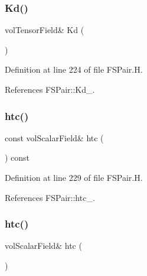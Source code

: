 \subsubsection{\texorpdfstring{Kd()}{Kd()}\hspace{0.1cm}{\footnotesize\ttfamily [2/2]}}
{\footnotesize\ttfamily vol\+Tensor\+Field\& Kd (\begin{DoxyParamCaption}{ }\end{DoxyParamCaption})\hspace{0.3cm}{\ttfamily [inline]}}



Definition at line 224 of file F\+S\+Pair.\+H.



References F\+S\+Pair\+::\+Kd\+\_\+.

\mbox{\label{classFoam_1_1FSPair_af32101ce02f4467ce8810572a2f2359c}} 
\subsubsection{\texorpdfstring{htc()}{htc()}\hspace{0.1cm}{\footnotesize\ttfamily [1/2]}}
{\footnotesize\ttfamily const vol\+Scalar\+Field\& htc (\begin{DoxyParamCaption}{ }\end{DoxyParamCaption}) const\hspace{0.3cm}{\ttfamily [inline]}}



Definition at line 229 of file F\+S\+Pair.\+H.



References F\+S\+Pair\+::htc\+\_\+.

\mbox{\label{classFoam_1_1FSPair_a335e4e1a5b225f46d3d55a033dd721cc}} 
\subsubsection{\texorpdfstring{htc()}{htc()}\hspace{0.1cm}{\footnotesize\ttfamily [2/2]}}
{\footnotesize\ttfamily vol\+Scalar\+Field\& htc (\begin{DoxyParamCaption}{ }\end{DoxyParamCaption})\hspace{0.3cm}{\ttfamily [inline]}}



